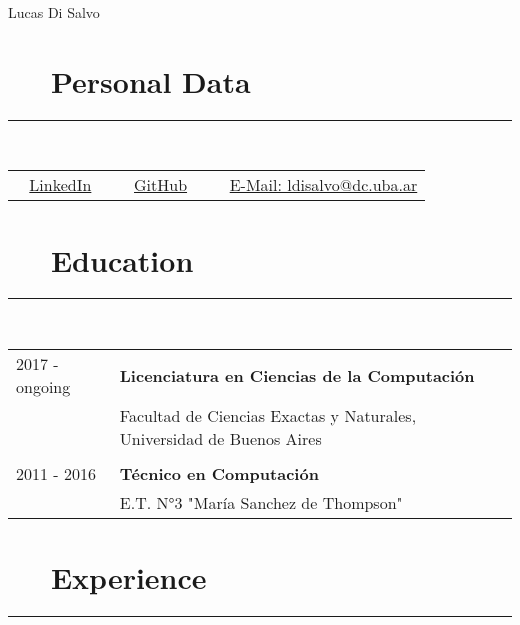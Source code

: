 \documentclass{article}
\begin{document}
\pagestyle{empty}

\par{\centering
		{\huge Lucas Di Salvo}
	\bigskip\par}

\section*{\faAt ~~ Personal Data} 
\hrule

\
\newline
\

\begin{tabular}{l | l | l}
      \faLinkedin ~ \href{https://www.linkedin.com/in/lucas-di-salvo-6578b915a}{LinkedIn} \
     & \faGithub ~ \href{https://github.com/lucasDS-0}{GitHub}  \
     & \faEnvelope ~ \href{mailto:ldisalvo@dc.uba.ar}{E-Mail: ldisalvo@dc.uba.ar}
\end{tabular}

\section*{\faBook ~~ Education} 
\hrule

\
\newline
\

\begin{tabular}{l l}
    2017 - ongoing  & \textbf{Licenciatura en Ciencias de la Computación}\\
                    & Facultad de Ciencias Exactas y Naturales, Universidad de Buenos Aires \\ \\
    2011 - 2016 & \textbf{Técnico en Computación} \\
                & E.T. N°3 "María Sanchez de Thompson"
\end{tabular}

\section*{\faCubes ~~ Experience} 
\hrule

\
\newline
\
\end{document}
